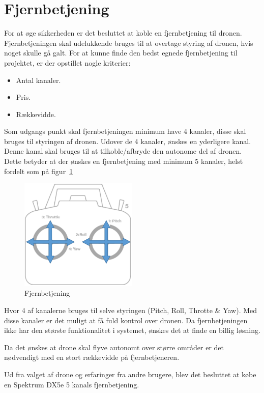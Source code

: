 \section{Fjernbetjening}

For at øge sikkerheden er det besluttet at koble en fjernbetjening til dronen. Fjernbetjeningen skal udelukkende bruges til at overtage styring af dronen, hvis noget skulle gå galt. For at kunne finde den bedst egnede fjernbetjening til projektet, er der opstillet nogle kriterier:

\begin{itemize}
	\item Antal kanaler.
	\item Pris.
	\item Rækkevidde.
\end{itemize}

Som udgangs punkt skal fjernbetjeningen minimum have 4 kanaler, disse skal bruges til styringen af dronen. Udover de 4 kanaler, ønskes en yderligere kanal. Denne kanal skal bruges til at tilkoble/afbryde den autonome del af dronen. Dette betyder at der ønskes en fjernbetjening med minimum 5 kanaler, helst fordelt som på figur~\ref{fig:fjernbetjening} 

\begin{figure}[H]
\centering
\includegraphics[width=0.5\textwidth]{Billeder/Fjernbetjening}
\caption{Fjernbetjening}
\label{fig:fjernbetjening}
\end{figure}

Hvor 4 af kanalerne bruges til selve styringen (Pitch, Roll, Throtte \& Yaw). Med disse kanaler er det muligt at få fuld kontrol over dronen.
Da fjernbetjeningen ikke har den største funktionalitet i systemet, ønskes det at finde en billig løsning. 

Da det ønskes at drone skal flyve autonomt over større områder er det nødvendigt med en stort rækkevidde på fjernbetjeneren.  

Ud fra valget af drone og erfaringer fra andre brugere, blev det besluttet at købe en Spektrum DX5e 5 kanals fjernbetjening.
